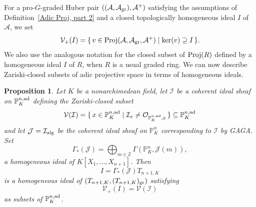 \documentclass[12pt,twoside,a4paper]{article}
\newtheorem{prop}[thm]{Proposition}
\theoremstyle{definition}
\theoremstyle{remark}
\newcommand\ad{{\rm ad}}
\newcommand\alg{{\rm alg}}
\newcommand\gr{{\rm gr}}
\newcommand\Proj{{\rm Proj}}
\begin{document}
For a pro-$G$-graded Huber pair $((\mathcal{A}, \mathcal{A}_{\gr}), \mathcal{A}^{+})$ satisfying the assumptions of Definition~\ref{Adic Proj, part 2} and a closed topologically homogeneous ideal $I$ of $\mathcal{A}$, we set \begin{equation*}\mathcal{V}_{+}(I)=\{\, v\in \Proj(\mathcal{A}, \mathcal{A}_{\gr}, \mathcal{A}^{+})\mid \ker(v)\supseteq I\,\}.\end{equation*}We also use the analogous notation for the closed subset of $\Proj(R)$ defined by a homogeneous ideal $I$ of $R$, when $R$ is a usual graded ring. We can now describe Zariski-closed subsets of adic projective space in terms of homogeneous ideals.
\begin{prop}\label{Zariski-closed subsets and homogeneous ideals}Let $K$ be a nonarchimedean field, let $\mathcal{I}$ be a coherent ideal sheaf on $\mathbb{P}_{K}^{n,\ad}$ defining the Zariski-closed subset \begin{equation*}\mathcal{V}(\mathcal{I})=\{\, x\in \mathbb{P}_{K}^{n,\ad}\mid \mathcal{I}_{x}\neq \mathcal{O}_{\mathbb{P}_{K}^{n,\ad},x}\,\}\subseteq \mathbb{P}_{K}^{n,\ad}\end{equation*}and let $\mathcal{J}=\mathcal{I}_{\alg}$ be the coherent ideal sheaf on $\mathbb{P}_{K}^{n}$ corresponding to $\mathcal{I}$ by GAGA. Set \begin{equation*}\Gamma_{\ast}(\mathcal{J})=\bigoplus_{m\in\mathbb{Z}}\Gamma(\mathbb{P}_{K}^{n}, \mathcal{J}(m)),\end{equation*}a homogeneous ideal of $K[X_1,\dots, X_{n+1}]$. Then \begin{equation*}I=\Gamma_{\ast}(\mathcal{J})T_{n+1, K}\end{equation*}is a homogeneous ideal of $(T_{n+1, K}, (T_{n+1, K})_{\gr})$ satisfying \begin{equation*}\mathcal{V}_{+}(I)=\mathcal{V}(\mathcal{I})\end{equation*}as subsets of $\mathbb{P}_{K}^{n,\ad}$.\end{prop}
\end{document}
